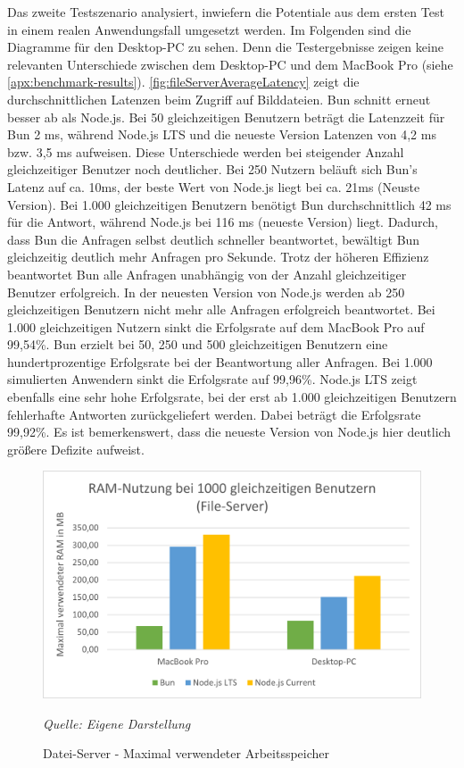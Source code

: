 \noindent
Das zweite Testszenario analysiert, inwiefern die Potentiale aus dem ersten Test in einem realen Anwendungsfall umgesetzt werden. Im Folgenden sind die Diagramme für den Desktop-PC zu sehen. Denn die Testergebnisse zeigen keine relevanten Unterschiede zwischen dem Desktop-PC und dem MacBook Pro (siehe \autoref{apx:benchmark-results}). \autoref{fig:fileServerAverageLatency} zeigt die durchschnittlichen Latenzen beim Zugriff auf Bilddateien. Bun schnitt erneut besser ab als Node.js. Bei 50 gleichzeitigen Benutzern beträgt die Latenzzeit für Bun 2 ms, während Node.js LTS und die neueste Version Latenzen von 4,2 ms bzw. 3,5 ms aufweisen. Diese Unterschiede werden bei steigender Anzahl gleichzeitiger Benutzer noch deutlicher. Bei 250 Nutzern beläuft sich Bun's Latenz auf ca. 10ms, der beste Wert von Node.js liegt bei ca. 21ms (Neuste Version). Bei 1.000 gleichzeitigen Benutzern benötigt Bun durchschnittlich 42 ms für die Antwort, während Node.js bei 116 ms (neueste Version) liegt. Dadurch, dass Bun die Anfragen selbst deutlich schneller beantwortet, bewältigt Bun gleichzeitig deutlich mehr Anfragen pro Sekunde. Trotz der höheren Effizienz beantwortet Bun alle Anfragen unabhängig von der Anzahl gleichzeitiger Benutzer erfolgreich. In der neuesten Version von Node.js werden ab 250 gleichzeitigen Benutzern nicht mehr alle Anfragen erfolgreich beantwortet. Bei 1.000 gleichzeitigen Nutzern sinkt die Erfolgsrate auf dem MacBook Pro auf 99,54\%. Bun erzielt bei 50, 250 und 500 gleichzeitigen Benutzern eine hundertprozentige Erfolgsrate bei der Beantwortung aller Anfragen. Bei 1.000 simulierten Anwendern sinkt die Erfolgsrate auf 99,96\%. Node.js LTS zeigt ebenfalls eine sehr hohe Erfolgsrate, bei der erst ab 1.000 gleichzeitigen Benutzern fehlerhafte Antworten zurückgeliefert werden. Dabei beträgt die Erfolgsrate 99,92\%. Es ist bemerkenswert, dass die neueste Version von Node.js hier deutlich größere Defizite aufweist.\\

\begin{figure}[h!]
	\centering
	\includegraphics[width=\linewidth]{./images/fileServerRamUsage.png}
	\caption{Datei-Server - Maximal verwendeter Arbeitsspeicher}
	\label{fig:fileServerRamUsage}
	\textit{Quelle: Eigene Darstellung}
\end{figure}


